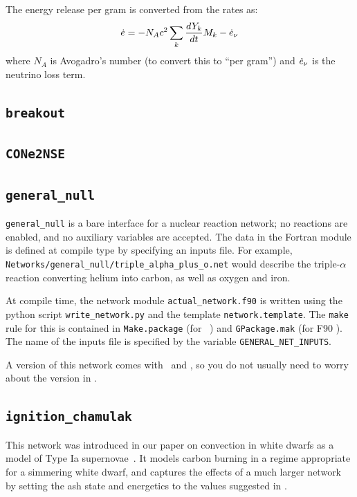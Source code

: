 The energy release per gram is converted from the rates as:
\begin{equation}
\dot{e} = -N_A c^2 \sum_k \frac{dY_k}{dt} M_k - \dot{e}_\nu
\end{equation}
where $N_A$ is Avogadro's number (to convert this to ``per gram'')
and $\dot{e}_\nu$ is the neutrino loss term.

\subsection{{\tt breakout}}

\subsection{{\tt CONe2NSE}}

\subsection{{\tt general\_null}}

{\tt general\_null} is a bare interface for a nuclear reaction
network; no reactions are enabled, and no auxiliary variables are
accepted.  The data in the Fortran module is defined at compile type
by specifying an inputs file.  For example, {\tt
  Networks/general\_null/triple\_alpha\_plus\_o.net} would describe
the triple-$\alpha$ reaction converting helium into carbon, as well as
oxygen and iron.

At compile time, the network module {\tt actual\_network.f90}
is written using the python script {\tt write\_network.py}
and the template {\tt network.template}.  The {\tt make} rule
for this is contained in {\tt Make.package} (for \cpp\ \boxlib) and
{\tt GPackage.mak} (for F90 \boxlib).  The name of the inputs file
is specified by the variable {\tt GENERAL\_NET\_INPUTS}.

A version of this network comes with \maestro\ and \castro, so you do
not usually need to worry about the version in \microphysics.


\subsection{{\tt ignition\_chamulak}}

This network was introduced in our paper on convection in white dwarfs
as a model of Type Ia supernovae~\cite{wdconvect}.  It models
carbon burning in a regime appropriate for a simmering white dwarf,
and captures the effects of a much larger network by setting the ash
state and energetics to the values suggested in \cite{chamulak:2008}.

